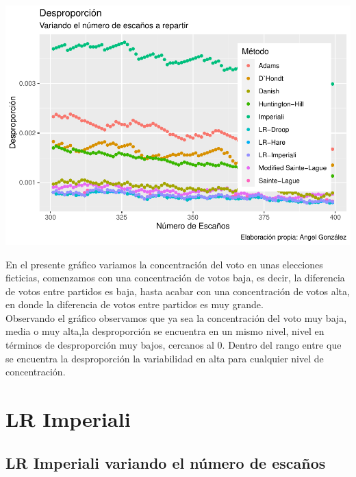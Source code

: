 \documentclass[12pt,a4paper,]{book}
\numberwithin{dummy}{section}
\theoremstyle{ocrenumbox}
\theoremstyle{blacknumex}
\theoremstyle{blacknumbox}
\theoremstyle{ocrenum}
\theoremstyle{ocrenum}
\begin{document}
\begin{center}\includegraphics[width=0.95\linewidth]{figurasR/unnamed-chunk-55-1} \end{center}

En el presente gráfico variamos la concentración del voto en unas
elecciones ficticias, comenzamos con una concentración de votos baja, es
decir, la diferencia de votos entre partidos es baja, hasta acabar con
una concentración de votos alta, en donde la diferencia de votos entre
partidos es muy grande.\\
Observando el gráfico observamos que ya sea la concentración del voto
muy baja, media o muy alta,la desproporción se encuentra en un mismo
nivel, nivel en términos de desproporción muy bajos, cercanos al 0.
Dentro del rango entre que se encuentra la desproporción la variabilidad
en alta para cualquier nivel de concentración.

\hypertarget{lr-imperiali}{%
\section{LR Imperiali}\label{lr-imperiali}}

\hypertarget{lr-imperiali-variando-el-nuxfamero-de-escauxf1os}{%
\subsection{LR Imperiali variando el número de
escaños}\label{lr-imperiali-variando-el-nuxfamero-de-escauxf1os}}
\end{document}
